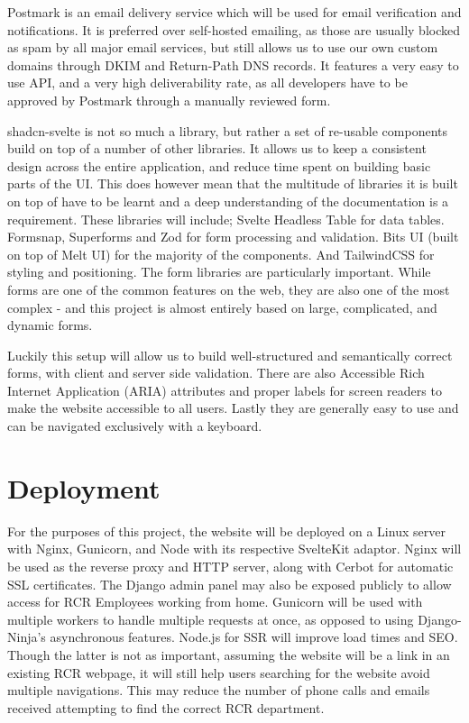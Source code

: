 Postmark is an email delivery service which will be used for email verification and notifications. It is preferred over self-hosted emailing, as those are usually blocked as spam by all major email services, but still allows us to use our own custom domains through DKIM and Return-Path DNS records. It features a very easy to use API, and a very high deliverability rate, as all developers have to be approved by Postmark through a manually reviewed form.

shadcn-svelte is not so much a library, but rather a set of re-usable components build on top of a number of other libraries. It allows us to keep a consistent design across the entire application, and reduce time spent on building basic parts of the UI. This does however mean that the multitude of libraries it is built on top of have to be learnt and a deep understanding of the documentation is a requirement. These libraries will include; Svelte Headless Table for data tables. Formsnap, Superforms and Zod for form processing and validation. Bits UI (built on top of Melt UI) for the majority of the components. And TailwindCSS for styling and positioning. The form libraries are particularly important. While forms are one of the common features on the web, they are also one of the most complex - and this project is almost entirely based on large, complicated, and dynamic forms.

Luckily this setup will allow us to build well-structured and semantically correct forms, with client and server side validation. There are also Accessible Rich Internet Application (ARIA) attributes and proper labels for screen readers to make the website accessible to all users. Lastly they are generally easy to use and can be navigated exclusively with a keyboard. 

\section{Deployment}
For the purposes of this project, the website will be deployed on a Linux server with Nginx, Gunicorn, and Node with its respective SvelteKit adaptor. Nginx will be used as the reverse proxy and HTTP server, along with Cerbot for automatic SSL certificates. The Django admin panel may also be exposed publicly to allow access for RCR Employees working from home. Gunicorn will be used with multiple workers to handle multiple requests at once, as opposed to using Django-Ninja's asynchronous features. Node.js for SSR will improve load times and SEO. Though the latter is not as important, assuming the website will be a link in an existing RCR webpage, it will still help users searching for the website avoid multiple navigations. This may reduce the number of phone calls and emails received attempting to find the correct RCR department.


